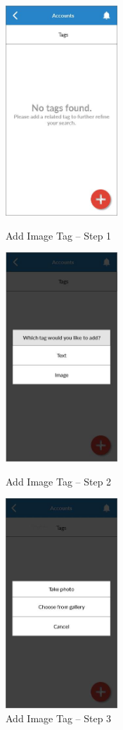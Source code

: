 \begin{figure}
  \subfigures
  \centering
  \begin{minipage}{4.6cm}
    \centering
    \includegraphics[width=4.2cm]{inc/ui_itag_step1.jpg}
    \caption{Add Image Tag -- Step 1}
    \label{fig:ui_itag_step1}
  \end{minipage}
  \begin{minipage}{4.6cm}
    \centering
    \includegraphics[width=4.2cm]{inc/ui_itag_step2.jpg}
    \caption{Add Image Tag -- Step 2}
    \label{fig:ui_itag_step2}
  \end{minipage}
  \begin{minipage}{4.6cm}
    \centering
    \includegraphics[width=4.2cm]{inc/ui_itag_step3.jpg}
    \caption{Add Image Tag -- Step 3}
    \label{fig:ui_itag_step3}
  \end{minipage}
\end{figure}


